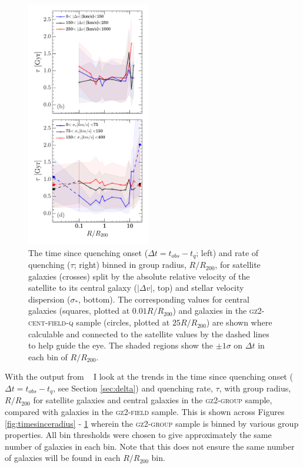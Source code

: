 \begin{figure}
{\includegraphics[width=0.48\textwidth]{environment/rate_of_quenching_delv_sigma.pdf}
\caption[Trend of $\Delta t$ and $\tau$ with group radius split by relative velocity and stellar velocity dispersion]{The time since quenching onset ($\Delta t = t_{obs} - t_{q}$; left) and rate of quenching ($\tau$; right) binned in group radius, $R/R_{200}$, for satellite galaxies (crosses) split by the absolute relative velocity of the satellite to its central galaxy ($|\Delta v|$, top) and stellar velocity dispersion ($\sigma_*$, bottom). The corresponding values for central galaxies (squares, plotted at $0.01 R/R_{200}$) and galaxies in the \textsc{gz2-cent-field-q} sample (circles, plotted at $25 R/R_{200}$) are shown where calculable and connected to the satellite values by the dashed lines to help guide the eye. The shaded regions show the $\pm1\sigma$ on $\Delta t$ in each bin of $R/R_{200}$.}
\label{fig:timesinceradiusvel}}
\end{figure}

With the output from \starpy~ I look at the trends in the time since quenching onset ($\Delta t = t_{obs} - t_{q}$, see Section \ref{sec:delta}) and quenching rate, $\tau$, with group radius, $R/R_{200}$ for satellite galaxies and central galaxies in the \textsc{gz2-group} sample, compared with galaxies in the \textsc{gz2-field} sample. This is shown across Figures \ref{fig:timesinceradius} - \ref{fig:timesinceradiusvel} wherein the \textsc{gz2-group} sample is binned by various group properties. All bin thresholds were chosen to give approximately the same number of galaxies in each bin. Note that this does not ensure the same number of galaxies will be found in each $R/R_{200}$ bin. 


